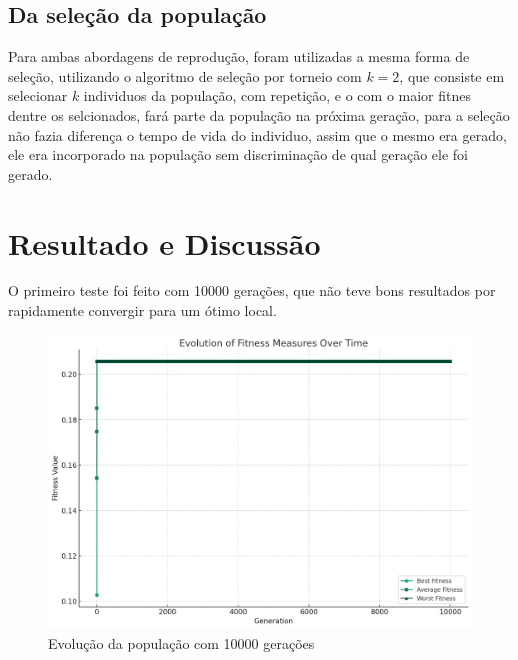\documentclass[12pt]{article}
\begin{document}
\subsection{Da seleção da população}
Para ambas abordagens de reprodução, foram utilizadas a mesma forma de seleção, utilizando o algoritmo de seleção por torneio com \(k=2\), que consiste em selecionar \(k\) individuos da população, com repetição, e o com o maior fitnes dentre os selcionados, fará parte da população na próxima geração, para a seleção não fazia diferença o tempo de vida do individuo, assim que o mesmo era gerado, ele era incorporado na população sem discriminação de qual geração ele foi gerado.
\section{Resultado e Discussão}

O primeiro teste foi feito com 10000 gerações, que não teve bons resultados por rapidamente convergir para um ótimo local.

\begin{figure}[h]
    \centering
    \includegraphics[width=0.5\linewidth]{1tentativa.png}
    \caption{Evolução da população com 10000 gerações}
    \label{fig:first-attempt}
\end{figure}
\end{document}
